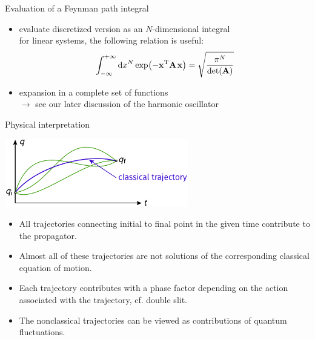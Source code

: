 \documentclass[t,dvipsnames]{beamer}
\begin{document}
\begin{frame}[c]{Evaluation of a Feynman path integral}
 \begin{itemize}
  \item evaluate discretized version as an $N$-dimensional integral\\
	for linear systems, the following relation is useful:
	\begin{displaymath}
	 \int_{-\infty}^{+\infty}\text{d}x^N \exp\!\left(-\mathbf{x}^\text{T}
	    \mathbf{A}\hspace{0.1em}\mathbf{x}\right) =
		\sqrt{\frac{\pi^N}{\det(\mathbf{A})}}
	\end{displaymath}
  \item expansion in a complete set of functions\\
	$\rightarrow$ see our later discussion of the harmonic oscillator
 \end{itemize}

 \vspace{0.5truecm}
 \begin{center}
 \end{center}
\end{frame}

\begin{frame}[t]{Physical interpretation}
 \begin{center}
  \includegraphics[width=0.6\textwidth]{feynman}
 \end{center}

 \begin{itemize}
  \item All trajectories connecting initial to final point in the given
	time contribute to the propagator.
  \item Almost all of these trajectories are not solutions of the
        corresponding classical equation of motion.
  \item Each trajectory contributes with a phase factor depending on 
	the action associated with the trajectory, cf. double slit.
  \item The nonclassical trajectories can be viewed as contributions
	of quantum fluctuations.
 \end{itemize}
\end{frame}
\end{document}
